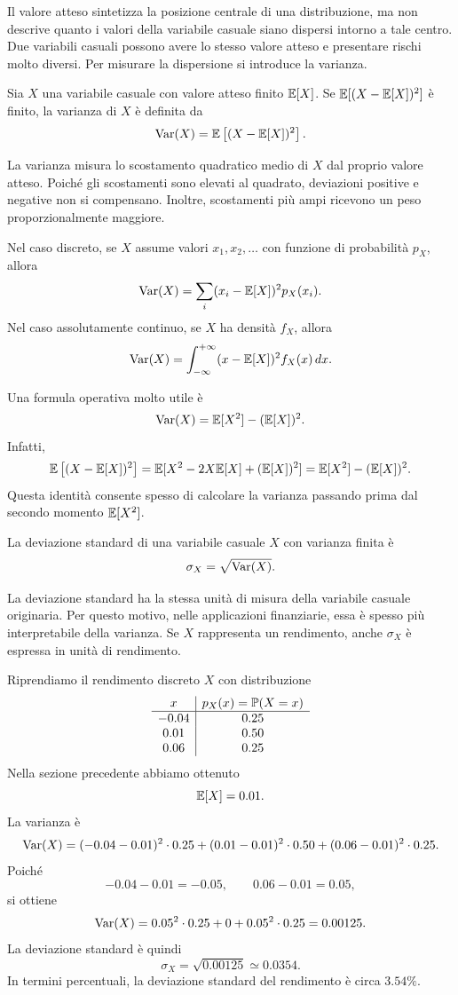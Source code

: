 Il valore atteso sintetizza la posizione centrale di una distribuzione, ma non
descrive quanto i valori della variabile casuale siano dispersi intorno a tale
centro. Due variabili casuali possono avere lo stesso valore atteso e presentare
rischi molto diversi. Per misurare la dispersione si introduce la varianza.

\begin{definition}[Varianza]
Sia $X$ una variabile casuale con valore atteso finito $\mathbb{E}[X]$. Se
$\mathbb{E}[(X-\mathbb{E}[X])^2]$ \`{e} finito, la varianza di $X$ \`{e} definita da
\[
\operatorname{Var}(X)
=
\mathbb{E}\left[(X-\mathbb{E}[X])^2\right].
\]
\end{definition}

La varianza misura lo scostamento quadratico medio di $X$ dal proprio valore
atteso. Poich\'{e} gli scostamenti sono elevati al quadrato, deviazioni positive
e negative non si compensano. Inoltre, scostamenti pi\`{u} ampi ricevono un peso
proporzionalmente maggiore.

Nel caso discreto, se $X$ assume valori $x_1,x_2,\ldots$ con funzione di
probabilit\`{a} $p_X$, allora
\[
\operatorname{Var}(X)
=
\sum_i (x_i-\mathbb{E}[X])^2p_X(x_i).
\]
Nel caso assolutamente continuo, se $X$ ha densit\`{a} $f_X$, allora
\[
\operatorname{Var}(X)
=
\int_{-\infty}^{+\infty}(x-\mathbb{E}[X])^2f_X(x)\,dx.
\]

Una formula operativa molto utile \`{e}
\[
\operatorname{Var}(X)
=
\mathbb{E}[X^2]-(\mathbb{E}[X])^2.
\]
Infatti,
\[
\mathbb{E}\left[(X-\mathbb{E}[X])^2\right]
=
\mathbb{E}[X^2-2X\mathbb{E}[X]+(\mathbb{E}[X])^2]
=
\mathbb{E}[X^2]-(\mathbb{E}[X])^2.
\]
Questa identit\`{a} consente spesso di calcolare la varianza passando prima dal
secondo momento $\mathbb{E}[X^2]$.

\begin{definition}
La deviazione standard di una variabile casuale $X$ con varianza finita \`{e}
\[
\sigma_X
=
\sqrt{\operatorname{Var}(X)}.
\]
\end{definition}

La deviazione standard ha la stessa unit\`{a} di misura della variabile casuale
originaria. Per questo motivo, nelle applicazioni finanziarie, essa \`{e} spesso
pi\`{u} interpretabile della varianza. Se $X$ rappresenta un rendimento, anche
$\sigma_X$ \`{e} espressa in unit\`{a} di rendimento.

\begin{example}
Riprendiamo il rendimento discreto $X$ con distribuzione
\[
\begin{array}{c|c}
x & p_X(x)=\mathbb{P}(X=x)\\
\hline
-0.04 & 0.25\\
 0.01 & 0.50\\
 0.06 & 0.25
\end{array}
\]
Nella sezione precedente abbiamo ottenuto
\[
\mathbb{E}[X]=0.01.
\]
La varianza \`{e}
\[
\operatorname{Var}(X)
=
(-0.04-0.01)^2\cdot 0.25
+
(0.01-0.01)^2\cdot 0.50
+
(0.06-0.01)^2\cdot 0.25.
\]
Poich\'{e}
\[
-0.04-0.01=-0.05,
\qquad
0.06-0.01=0.05,
\]
si ottiene
\[
\operatorname{Var}(X)
=
0.05^2\cdot 0.25
+
0
+
0.05^2\cdot 0.25
=
0.00125.
\]
La deviazione standard \`{e} quindi
\[
\sigma_X
=
\sqrt{0.00125}
\simeq
0.0354.
\]
In termini percentuali, la deviazione standard del rendimento \`{e} circa
$3.54\%$.
\end{example}

